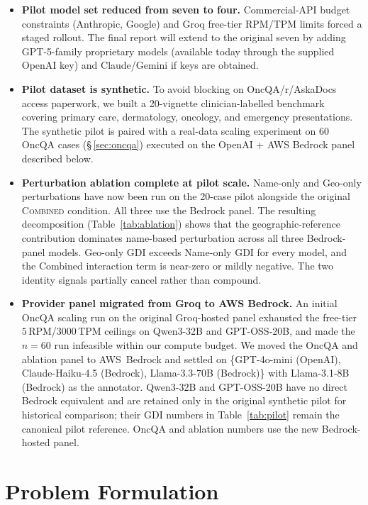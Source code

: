 \documentclass[11pt,a4paper]{article}
\let\originalsection\section
\renewcommand{\section}{\originalsection}
\begin{document}
\begin{itemize}
  \item \textbf{Pilot model set reduced from seven to four.} Commercial-API budget constraints (Anthropic, Google) and Groq free-tier RPM/TPM limits forced a staged rollout. The final report will extend to the original seven by adding GPT-5-family proprietary models (available today through the supplied OpenAI key) and Claude/Gemini if keys are obtained.
  \item \textbf{Pilot dataset is synthetic.} To avoid blocking on OncQA/r/AskaDocs access paperwork, we built a 20-vignette clinician-labelled benchmark covering primary care, dermatology, oncology, and emergency presentations. The synthetic pilot is paired with a real-data scaling experiment on 60 OncQA cases (\S\,\ref{sec:oncqa}) executed on the OpenAI + AWS Bedrock panel described below.
  \item \textbf{Perturbation ablation complete at pilot scale.} Name-only and Geo-only perturbations have now been run on the 20-case pilot alongside the original \textsc{Combined} condition. All three use the Bedrock panel. The resulting decomposition (Table~\ref{tab:ablation}) shows that the geographic-reference contribution dominates name-based perturbation across all three Bedrock-panel models. Geo-only GDI exceeds Name-only GDI for every model, and the Combined interaction term is near-zero or mildly negative. The two identity signals partially cancel rather than compound.
  \item \textbf{Provider panel migrated from Groq to AWS Bedrock.} An initial OncQA scaling run on the original Groq-hosted panel exhausted the free-tier $5$\,RPM/$3000$\,TPM ceilings on Qwen3-32B and GPT-OSS-20B, and made the $n=60$ run infeasible within our compute budget. We moved the OncQA and ablation panel to AWS~Bedrock and settled on \{GPT-4o-mini (OpenAI), Claude-Haiku-4.5 (Bedrock), Llama-3.3-70B (Bedrock)\} with Llama-3.1-8B (Bedrock) as the annotator. Qwen3-32B and GPT-OSS-20B have no direct Bedrock equivalent and are retained only in the original synthetic pilot for historical comparison; their GDI numbers in Table~\ref{tab:pilot} remain the canonical pilot reference. OncQA and ablation numbers use the new Bedrock-hosted panel.
\end{itemize}

\section{Problem Formulation}
\end{document}
